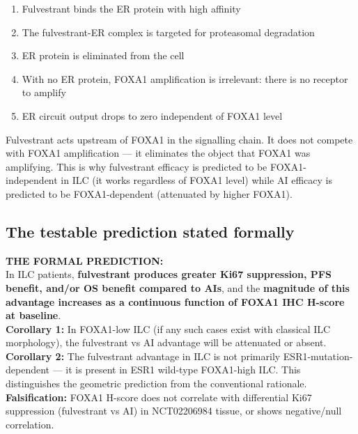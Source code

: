 \documentclass[12pt, a4paper]{article}
\begin{document}
\begin{enumerate}
    \item Fulvestrant binds the ER protein with
    high affinity
    \item The fulvestrant-ER complex is targeted
    for proteasomal degradation
    \item ER protein is eliminated from the cell
    \item With no ER protein, FOXA1 amplification
    is irrelevant: there is no receptor to amplify
    \item ER circuit output drops to zero
    independent of FOXA1 level
\end{enumerate}

Fulvestrant acts upstream of FOXA1 in the
signalling chain. It does not compete with FOXA1
amplification --- it eliminates the object that
FOXA1 was amplifying. This is why fulvestrant
efficacy is predicted to be FOXA1-independent
in ILC (it works regardless of FOXA1 level) while
AI efficacy is predicted to be FOXA1-dependent
(attenuated by higher FOXA1).

\subsection{The testable prediction stated formally}

\begin{center}
\colorbox{findingbox}{
\begin{minipage}{0.88\textwidth}
\vspace{0.5em}
\textbf{THE FORMAL PREDICTION:}\\[0.4em]
In ILC patients, \textbf{fulvestrant produces
greater Ki67 suppression, PFS benefit, and/or OS
benefit compared to AIs}, and the \textbf{magnitude
of this advantage increases as a continuous
function of FOXA1 IHC H-score at baseline}.\\[0.4em]
\textbf{Corollary 1:} In FOXA1-low ILC (if any
such cases exist with classical ILC morphology),
the fulvestrant vs AI advantage will be
attenuated or absent.\\[0.4em]
\textbf{Corollary 2:} The fulvestrant advantage
in ILC is not primarily ESR1-mutation-dependent
--- it is present in ESR1 wild-type FOXA1-high
ILC. This distinguishes the geometric prediction
from the conventional rationale.\\[0.4em]
\textbf{Falsification:} FOXA1 H-score does not
correlate with differential Ki67 suppression
(fulvestrant vs AI) in NCT02206984 tissue,
or shows negative/null correlation.
\vspace{0.5em}
\end{minipage}}
\end{center}
\end{document}
